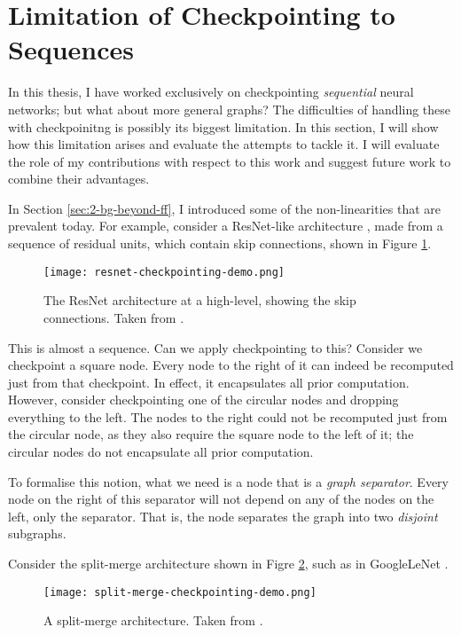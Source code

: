 \section{Limitation of Checkpointing to Sequences} \label{sec:5-qual-eval-seq-only}
In this thesis, I have worked exclusively on checkpointing \textit{sequential} neural networks; but what about more general graphs?
The difficulties of handling these with checkpoinitng is possibly its biggest limitation.
In this section, I will show how this limitation arises and evaluate the attempts to tackle it.
I will evaluate the role of my contributions with respect to this work and suggest future work to combine their advantages.

In Section \ref{sec:2-bg-beyond-ff}, I introduced some of the non-linearities that are prevalent today.
For example, consider a ResNet-like architecture \cite{He2016-resnet}, made from a sequence of residual units, which contain skip connections, shown in Figure \ref{fig:5-resnet-arch}.

\begin{figure}[h]
    \centering
    \texttt{[image: resnet-checkpointing-demo.png]}
    \caption{The ResNet architecture at a high-level, showing the skip connections. Taken from \cite{Bulatov-checkpointing-article}.}
    \label{fig:5-resnet-arch}
\end{figure}

This is almost a sequence.
Can we apply checkpointing to this?
Consider we checkpoint a square node.
Every node to the right of it can indeed be recomputed just from that checkpoint.
In effect, it encapsulates all prior computation.
However, consider checkpointing one of the circular nodes and dropping everything to the left.
The nodes to the right could not be recomputed just from the circular node, as they also require the square node to the left of it;
the circular nodes do not encapsulate all prior computation.

To formalise this notion, what we need is a node that is a \textit{graph separator}.
Every node on the right of this separator will not depend on any of the nodes on the left, only the separator.
That is, the node separates the graph into two \textit{disjoint} subgraphs.

Consider the split-merge architecture shown in Figre \ref{fig:5-split-merge-arch}, such as in GoogleLeNet \cite{Szegedy2015-inception}.

\begin{figure}[h]
    \centering
    \texttt{[image: split-merge-checkpointing-demo.png]}
    \caption{A split-merge architecture. Taken from \cite{Bulatov-checkpointing-article}.}
    \label{fig:5-split-merge-arch}
\end{figure}

